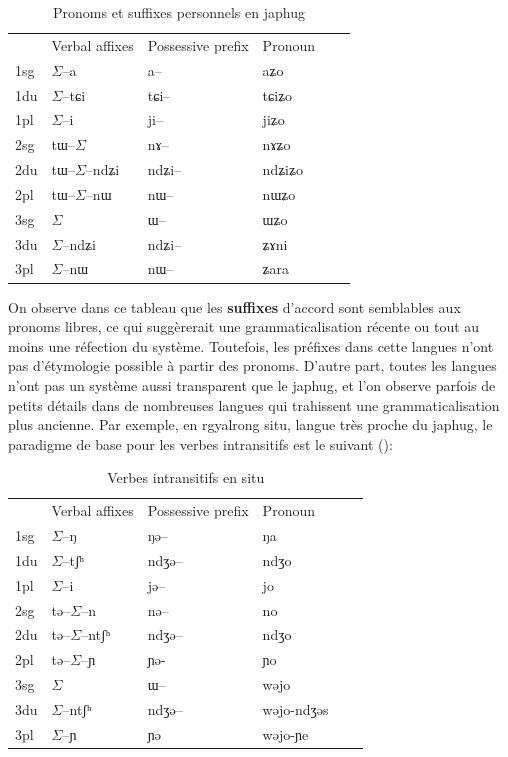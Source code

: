 \documentclass[oldfontcommands,oneside,a4paper,11pt]{memoir}
\newcommand{\ipa}[1]{{\phon #1}} %
\newcommand{\sig}{\begin{math}\Sigma\end{math}}
\begin{document}
\begin{table}[H]
\caption{Pronoms et suffixes personnels en japhug}\label{tab:japhug}
\begin{tabular}{llllll} 
	&Verbal affixes &	Possessive prefix &	Pronoun \\
1sg &	\ipa{\sig{}--a} &	\ipa{a–} &	\ipa{aʑo} \\
1du &	\ipa{\sig{}--tɕi} &	\ipa{tɕi–} &	\ipa{tɕiʑo}\\
1pl &	\ipa{\sig{}--i} &	\ipa{ji–} &	\ipa{jiʑo}\\
2sg &	\ipa{tɯ--\sig{}} &	\ipa{nɤ–} &	\ipa{nɤʑo} \\
2du &	\ipa{tɯ--\sig{}--ndʑi} &	\ipa{ndʑi–} &	\ipa{ndʑiʑo} \\
2pl &	\ipa{tɯ--\sig{}--nɯ} &	\ipa{nɯ–} &	\ipa{nɯʑo} \\
3sg &	\sig{}  &	\ipa{ɯ–} &	\ipa{ɯʑo} \\ 
3du &	\sig{}\ipa{--ndʑi} &	\ipa{ndʑi–} &	\ipa{ʑɤni} \\
3pl &	\sig{}\ipa{--nɯ} &	\ipa{nɯ–} &	\ipa{ʑara} \\

\end{tabular}
\end{table}
On observe dans ce tableau que les \textbf{suffixes} d'accord sont semblables aux pronoms libres, ce qui suggèrerait une grammaticalisation récente ou tout au moins une réfection du système. Toutefois, les préfixes dans cette langues n'ont pas d'étymologie possible à partir des pronoms. D'autre part, toutes les langues n'ont pas un système aussi transparent que le japhug, et l'on observe parfois de petits détails dans de nombreuses langues qui trahissent une grammaticalisation plus ancienne. Par exemple, en rgyalrong situ, langue très proche du japhug, le paradigme de base pour les verbes intransitifs est le suivant (\citealt[168, 198]{linxr93jiarong}):
\begin{table}[H]
\caption{Verbes intransitifs en situ }\label{tab:situ1}
\begin{tabular}{llllll} 
	&Verbal affixes &	Possessive prefix &	Pronoun \\
1sg &	\ipa{\sig{}--ŋ} &	\ipa{ŋə–} &	\ipa{ŋa} \\
1du &	\ipa{\sig{}--tʃʰ} &	\ipa{ndʒə–} &	\ipa{ndʒo}\\
1pl &	\ipa{\sig{}--i} &	\ipa{jə–} &	\ipa{jo}\\
2sg &	\ipa{tə--\sig{}--n} &	\ipa{nə–} &	\ipa{no} \\
2du &	\ipa{tə--\sig{}--ntʃʰ} &	\ipa{ndʒə–} &	\ipa{ndʒo} \\
2pl &	\ipa{tə--\sig{}--ɲ} &	\ipa{ɲə-} &	\ipa{ɲo} \\
3sg &	\sig{}  &	\ipa{ɯ–} &	\ipa{wəjo} \\ 
3du &	\sig{}\ipa{--ntʃʰ} &	\ipa{ndʒə–} &	\ipa{wəjo-ndʒəs} \\
3pl &	\sig{}\ipa{--ɲ} &	\ipa{ɲə} &	\ipa{wəjo-ɲe} \\
\end{tabular}
\end{table}
\end{document}
